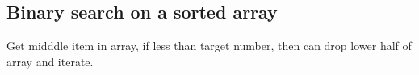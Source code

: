 
\subsection{Binary search on a sorted array}

Get midddle item in array, if less than target number, then can drop lower half of array and iterate.
